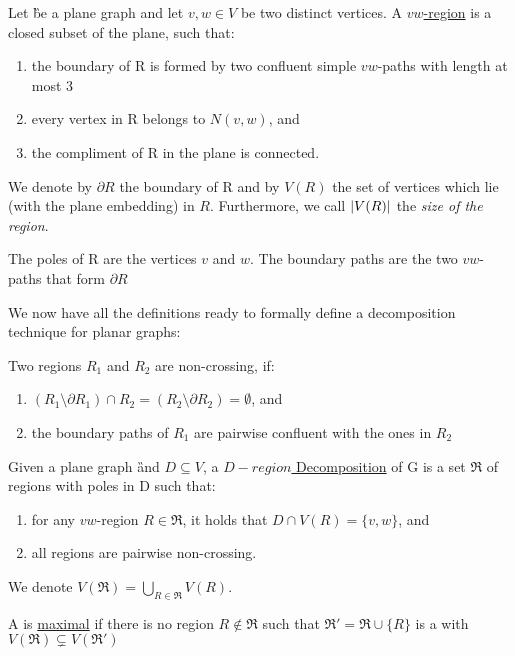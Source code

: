 \begin{definition}
    Let \G be a plane graph and let $v,w \in V$ be two distinct vertices. A \underline{$vw$-region} is a closed subset of the plane, such that:
    \begin{enumerate}
        \item the boundary of R is formed by two confluent simple $vw$-paths with length at most 3
        \item every vertex in R belongs to $N(v,w)$, and 
        \item the compliment of R in the plane is connected.
    \end{enumerate}

    We denote by $\partial R$ the boundary of R and by $V(R)$ the set of vertices which lie (with the plane embedding) in $R$. Furthermore, we call $\abs{V(R)}$ the \textit{size of the region}.

    The poles of R are the vertices $v$ and $w$. The boundary paths are the two $vw$-paths that form $\partial R$ 

\end{definition}


We now have all the definitions ready to formally define a decomposition technique for planar graphs:

\begin{definition}
    Two regions $R_1$ and $R_2$ are non-crossing, if:
    \begin{enumerate}
        \item $(R_1 \setminus \partial R_1) \cap R_2 = (R_2 \setminus \partial R_2) = \emptyset$, and 
        \item the boundary paths of $R_1$ are pairwise confluent with the ones in $R_2$
    \end{enumerate}
\end{definition}

\begin{definition}
    Given a plane graph \G and $D\subseteq V$, a \underline{$D-region$ Decomposition} of G is a set $\mathfrak{R}$ of regions with poles in D such that: 
    \begin{enumerate}
        \item for any $vw$-region $R \in \mathfrak{R} $, it holds that $D \cap V(R) = \{v, w\}$, and
        \item all regions are pairwise non-crossing. 
    \end{enumerate}
    We denote $V(\mathfrak{R}) = \bigcup\limits_{R \in \mathfrak{R}} V(R)$. 
    
    \noindent A \dreg is \underline{maximal} if there is no region $R \notin \mathfrak{R}$ such that $\mathfrak{R}' = \mathfrak{R} \cup \{R\}$ is a \dreg with $V(\mathfrak{R}) \subsetneq V(\mathfrak{R}')$
\end{definition}


